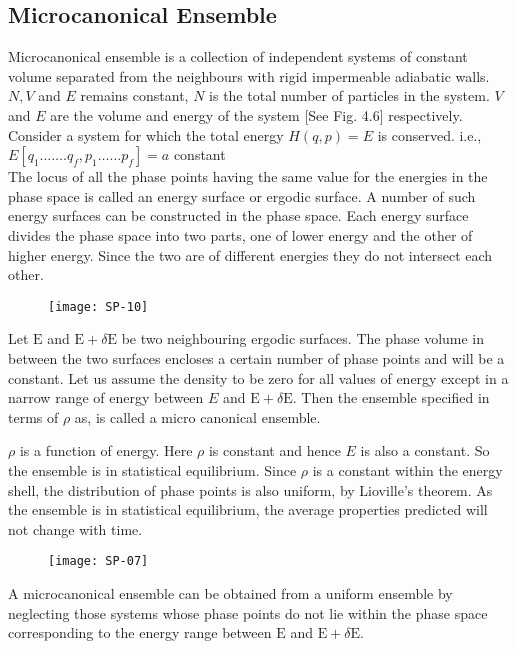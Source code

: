\subsection{Microcanonical Ensemble}
Microcanonical ensemble is a collection of independent systems of constant volume separated from the neighbours with rigid impermeable adiabatic walls. $N, V$ and $E$ remains constant, $N$ is the total number of particles in the system. $V$ and $E$ are the volume and energy of the system [See Fig. 4.6] respectively.\\
Consider a system for which the total energy $H(q, p)=E$ is conserved. i.e., $E\left[q_{1} \ldots \ldots . q_{f}, p_{1} \ldots \ldots p_{f}\right]=a$ constant\\
The locus of all the phase points having the same value for the energies in the phase space is called an energy surface or ergodic surface. A number of such energy surfaces can be constructed in the phase space. Each energy surface divides the phase space into two parts, one of lower energy and the other of higher energy. Since the two are of different energies they do not intersect each other.
\begin{figure}[H]
	\centering
	\texttt{[image: SP-10]}
\end{figure}
Let $\mathrm{E}$ and $\mathrm{E}+\delta \mathrm{E}$ be two neighbouring ergodic surfaces. The phase volume in between the two surfaces encloses a certain number of phase points and will be a constant. Let us assume the density to be zero for all values of energy except in a narrow range of energy between $E$ and $\mathrm{E}+\delta \mathrm{E}$. Then the ensemble specified in terms of $\rho$ as, is called a micro canonical ensemble.

$\rho$ is a function of energy. Here $\rho$ is constant and hence $E$ is also a constant. So the ensemble is in statistical equilibrium. Since $\rho$ is a constant within the energy shell, the distribution of phase points is also uniform, by Lioville's theorem. As the ensemble is in statistical equilibrium, the average properties predicted will not change with time.\\
\begin{figure}[H]
	\centering
	\texttt{[image: SP-07]}
\end{figure}
A microcanonical ensemble can be obtained from a uniform ensemble by neglecting those systems whose phase points do not lie within the phase space corresponding to the energy range between $\mathrm{E}$ and $\mathrm{E}+\delta \mathrm{E}$.

